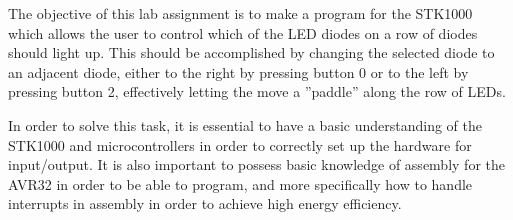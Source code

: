The objective of this lab assignment is to make a program for the STK1000 which allows the user to control which of the LED diodes on a row of diodes should light up.
This should be accomplished by changing the selected diode to an adjacent diode, either to the right by pressing button 0 or to the left by pressing button 2, effectively letting the move a ''paddle'' along the row of LEDs.

In order to solve this task, it is essential to have a basic understanding of the STK1000 and microcontrollers in order to correctly set up the hardware for input/output.
It is also important to possess basic knowledge of assembly for the AVR32 in order to be able to program, and more specifically how to handle interrupts in assembly in order to achieve high energy efficiency.
